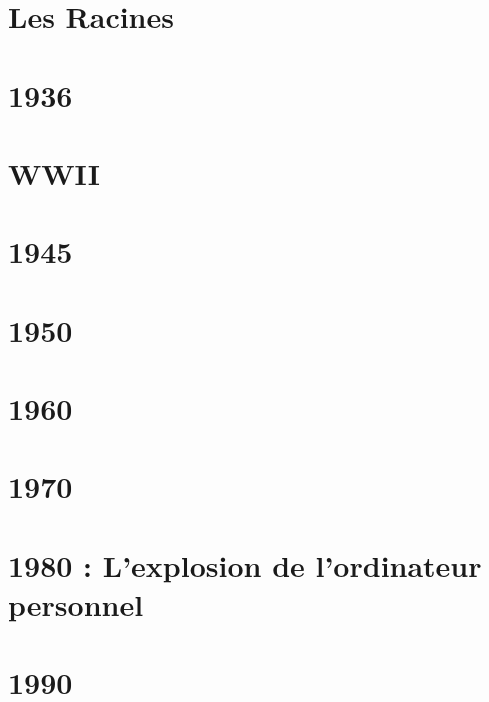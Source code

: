 \documentclass[a4paper, 11pt]{book}
\begin{document}
\chapter{ Les Racines }

\chapter{ 1936 }

\chapter{ WWII }

\chapter{ 1945 }

\chapter{ 1950 }

\chapter{ 1960 }

\chapter{ 1970 }

\chapter{ 1980 : L'explosion de l'ordinateur personnel }



\chapter{ 1990 }

\tableofcontents
\end{document}
